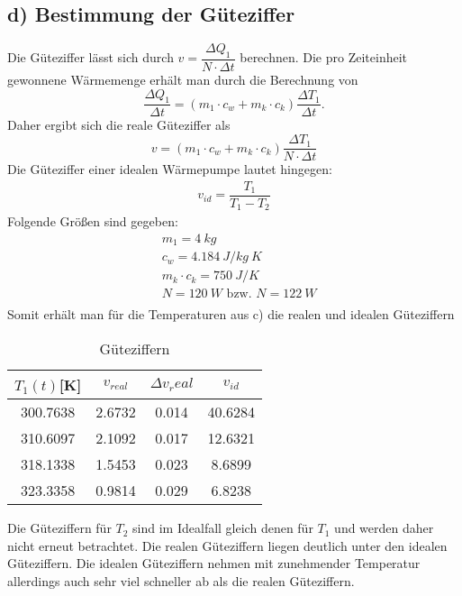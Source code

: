 \subsection{d) Bestimmung der Güteziffer}
Die Güteziffer lässt sich durch $v = \dfrac{\Delta Q_1}{N\cdot \Delta t}$ berechnen.
Die pro Zeiteinheit gewonnene Wärmemenge erhält man durch die Berechnung von 
\begin{equation}
  \dfrac{\Delta Q_1}{\Delta t}=(m_1\cdot c_w+m_k\cdot c_k)\dfrac{\Delta T_1}{\Delta t}.
\end{equation}
Daher ergibt sich die reale Güteziffer als 
\begin{equation*}
  v=(m_1\cdot c_w+m_k\cdot c_k)\dfrac{\Delta T_1}{N\cdot \Delta t}
\end{equation*}
Die Güteziffer einer idealen Wärmepumpe lautet hingegen:
\begin{align*}
  v_{id}=\dfrac{T_1}{T_1-T_2}
\end{align*}
Folgende Größen sind gegeben:
\begin{align*}
  &m_1=4\ kg\\
  &c_w= 4.184\ J/kg\ K\\
  &m_k \cdot c_k = 750\ J/K\\
  &N=120\ W \text{  bzw.  } N=122\ W\\
\end{align*}
Somit erhält man für die Temperaturen aus c) die realen und idealen Güteziffern \\
\begin{table}[H]
  \centering
  \caption{Güteziffern}
  \label{tab:data1}
  \begin{tabular}{c c c c}
    \toprule
    $T_1(t)$[K] & $v_{real}$ & $\Delta v_real$ & $v_{id}$\\
    \midrule
      300.7638 & 2.6732 & 0.014 & 40.6284\\
      310.6097 & 2.1092 & 0.017 & 12.6321\\
      318.1338 & 1.5453 & 0.023 & 8.6899\\
      323.3358 & 0.9814 & 0.029 & 6.8238\\
    \bottomrule
  \end{tabular}
\end{table}
Die Güteziffern für $T_2$ sind im Idealfall gleich denen für $T_1$ und werden daher nicht erneut betrachtet.
Die realen Güteziffern liegen deutlich unter den idealen Güteziffern. Die idealen Güteziffern nehmen mit zunehmender
Temperatur allerdings auch sehr viel schneller ab als die realen Güteziffern.




